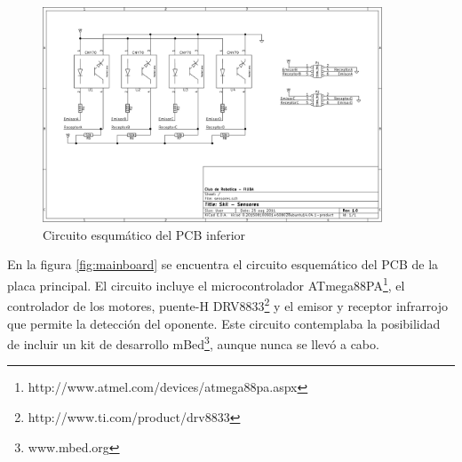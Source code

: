 \documentclass[12pt,a4paper]{article}
\begin{document}
\begin{figure}[h!]
  \begin{center}
    \includegraphics[width=0.9\textwidth]{img/sensores}
  \end{center}
  \vspace{-0.8cm}
  \caption{Circuito esqumático del PCB inferior}
  \label{fig:sensores}
\end{figure}

En la figura \ref{fig:mainboard} se encuentra el circuito esquemático del PCB
de la placa principal.
El circuito incluye el microcontrolador
ATmega88PA\footnote{http://www.atmel.com/devices/atmega88pa.aspx}, el
controlador de los motores, puente-H
DRV8833\footnote{http://www.ti.com/product/drv8833} y el emisor y receptor
infrarrojo que permite la detección del oponente.
Este circuito contemplaba la posibilidad de incluir un kit de desarrollo mBed\footnote{www.mbed.org}, aunque nunca se llevó a cabo.
\end{document}
